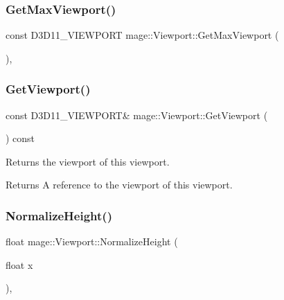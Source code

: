 \hypertarget{structmage_1_1_viewport_aec4a434cbb6f68805d02f1be6ecbf5a8}{}\label{structmage_1_1_viewport_aec4a434cbb6f68805d02f1be6ecbf5a8} 
\subsubsection{\texorpdfstring{Get\+Max\+Viewport()}{GetMaxViewport()}}
{\footnotesize\ttfamily const D3\+D11\+\_\+\+V\+I\+E\+W\+P\+O\+RT mage\+::\+Viewport\+::\+Get\+Max\+Viewport (\begin{DoxyParamCaption}{ }\end{DoxyParamCaption})\hspace{0.3cm}{\ttfamily [static]}, {\ttfamily [noexcept]}}

\hypertarget{structmage_1_1_viewport_ad4bb75cdfbd137182898caad913de4d1}{}\label{structmage_1_1_viewport_ad4bb75cdfbd137182898caad913de4d1} 
\subsubsection{\texorpdfstring{Get\+Viewport()}{GetViewport()}}
{\footnotesize\ttfamily const D3\+D11\+\_\+\+V\+I\+E\+W\+P\+O\+RT\& mage\+::\+Viewport\+::\+Get\+Viewport (\begin{DoxyParamCaption}{ }\end{DoxyParamCaption}) const\hspace{0.3cm}{\ttfamily [noexcept]}}

Returns the viewport of this viewport.

\begin{DoxyReturn}{Returns}
A reference to the viewport of this viewport. 
\end{DoxyReturn}
\hypertarget{structmage_1_1_viewport_a5dd77b43f7d40cdb9efa6896691ed1d5}{}\label{structmage_1_1_viewport_a5dd77b43f7d40cdb9efa6896691ed1d5} 
\subsubsection{\texorpdfstring{Normalize\+Height()}{NormalizeHeight()}}
{\footnotesize\ttfamily float mage\+::\+Viewport\+::\+Normalize\+Height (\begin{DoxyParamCaption}\item[{float}]{x }\end{DoxyParamCaption})\hspace{0.3cm}{\ttfamily [static]}, {\ttfamily [noexcept]}}


